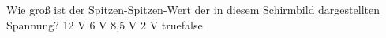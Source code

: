     {Wie groß ist der Spitzen-Spitzen-Wert der in diesem Schirmbild dargestellten Spannung?}
    {12 V}
    {6 V}
    {8,5 V}
    {2 V}
    {true}{false}